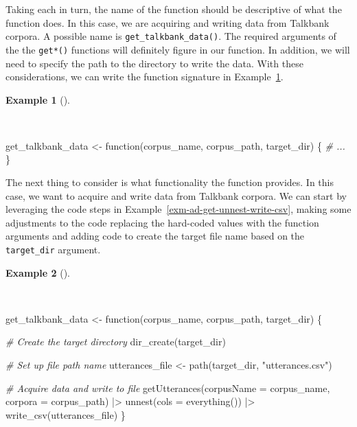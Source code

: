\documentclass[
  letterpaper,
]{latex/krantz}
\newenvironment{Shaded}{\begin{snugshade}}{\end{snugshade}}
\newcommand{\AttributeTok}[1]{\textcolor[rgb]{0.00,0.00,0.00}{#1}}
\newcommand{\CommentTok}[1]{\textcolor[rgb]{0.00,0.00,0.00}{\textit{#1}}}
\newcommand{\ControlFlowTok}[1]{\textcolor[rgb]{0.00,0.00,0.00}{#1}}
\newcommand{\FunctionTok}[1]{\textcolor[rgb]{0.00,0.00,0.00}{#1}}
\newcommand{\NormalTok}[1]{\textcolor[rgb]{0.00,0.00,0.00}{#1}}
\newcommand{\OtherTok}[1]{\textcolor[rgb]{0.00,0.00,0.00}{#1}}
\newcommand{\SpecialCharTok}[1]{\textcolor[rgb]{0.00,0.00,0.00}{#1}}
\newcommand{\StringTok}[1]{\textcolor[rgb]{0.00,0.00,0.00}{#1}}
\theoremstyle{definition}
\newtheorem{example}{Example}[chapter]
\theoremstyle{remark}
\begin{document}
Taking each in turn, the name of the function should be descriptive of
what the function does. In this case, we are acquiring and writing data
from Talkbank corpora. A possible name is
\texttt{get\_talkbank\_data()}. The required arguments of the the
\texttt{get*()} functions will definitely figure in our function. In
addition, we will need to specify the path to the directory to write the
data. With these considerations, we can write the function signature in
Example~\ref{exm-ad-get-talkbank-data-1}.

\begin{example}[]\protect\hypertarget{exm-ad-get-talkbank-data-1}{}\label{exm-ad-get-talkbank-data-1}

~

\begin{Shaded}
\begin{Highlighting}[]
\NormalTok{get\_talkbank\_data }\OtherTok{\textless{}{-}} \ControlFlowTok{function}\NormalTok{(corpus\_name, corpus\_path, target\_dir) \{}
  \CommentTok{\# ...}
\NormalTok{\}}
\end{Highlighting}
\end{Shaded}

\end{example}

The next thing to consider is what functionality the function provides.
In this case, we want to acquire and write data from Talkbank corpora.
We can start by leveraging the code steps in
Example~\ref{exm-ad-get-unnest-write-csv}, making some adjustments to
the code replacing the hard-coded values with the function arguments and
adding code to create the target file name based on the
\texttt{target\_dir} argument.

\begin{example}[]\protect\hypertarget{exm-ad-get-talkbank-data-2}{}\label{exm-ad-get-talkbank-data-2}

~

\begin{Shaded}
\begin{Highlighting}[]
\NormalTok{get\_talkbank\_data }\OtherTok{\textless{}{-}} \ControlFlowTok{function}\NormalTok{(corpus\_name, corpus\_path, target\_dir) \{}

  \CommentTok{\# Create the target directory}
  \FunctionTok{dir\_create}\NormalTok{(target\_dir)}

  \CommentTok{\# Set up file path name}
\NormalTok{  utterances\_file  }\OtherTok{\textless{}{-}} \FunctionTok{path}\NormalTok{(target\_dir, }\StringTok{"utterances.csv"}\NormalTok{)}

  \CommentTok{\# Acquire data and write to file}
  \FunctionTok{getUtterances}\NormalTok{(}\AttributeTok{corpusName =}\NormalTok{ corpus\_name, }\AttributeTok{corpora =}\NormalTok{ corpus\_path) }\SpecialCharTok{|\textgreater{}}
    \FunctionTok{unnest}\NormalTok{(}\AttributeTok{cols =} \FunctionTok{everything}\NormalTok{()) }\SpecialCharTok{|\textgreater{}}
    \FunctionTok{write\_csv}\NormalTok{(utterances\_file)}
\NormalTok{\}}
\end{Highlighting}
\end{Shaded}

\end{example}
\end{document}
